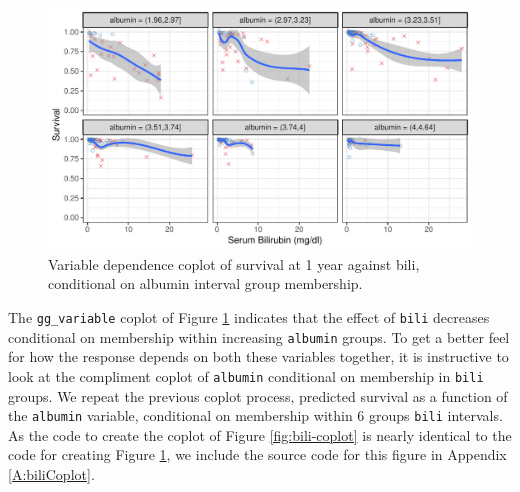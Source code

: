 \documentclass[article]{jss}
\begin{document}
\begin{Schunk}
\begin{figure}[!htb]

{\centering \includegraphics{fig-rfs/rfs-albumin-coplot-1} 

}

\caption[Variable dependence coplot of survival at 1 year against bili, conditional on albumin interval group membership]{Variable dependence coplot of survival at 1 year against bili, conditional on albumin interval group membership.}\label{fig:albumin-coplot}
\end{figure}
\end{Schunk}

The \texttt{gg\_variable} coplot of Figure \ref{fig:albumin-coplot}
indicates that the effect of \texttt{bili} decreases conditional on
membership within increasing \texttt{albumin} groups. To get a better
feel for how the response depends on both these variables together, it
is instructive to look at the compliment coplot of \texttt{albumin}
conditional on membership in \texttt{bili} groups. We repeat the
previous coplot process, predicted survival as a function of the
\texttt{albumin} variable, conditional on membership within 6 groups
\texttt{bili} intervals. As the code to create the coplot of Figure
\ref{fig:bili-coplot} is nearly identical to the code for creating
Figure \ref{fig:albumin-coplot}, we include the source code for this
figure in Appendix \ref{A:biliCoplot}.
\end{document}
